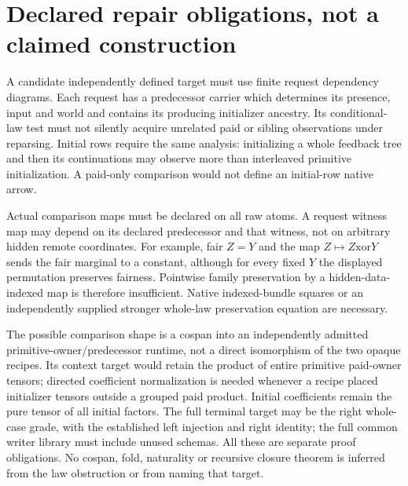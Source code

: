 \documentclass[11pt]{article}\usepackage{amsmath,amssymb,geometry}\geometry{margin=1in}
\begin{document}
\section*{Declared repair obligations, not a claimed construction}
A candidate independently defined target must use finite request dependency diagrams. Each request has a predecessor carrier which determines its presence, input and world and contains its producing initializer ancestry. Its conditional-law test must not silently acquire unrelated paid or sibling observations under reparsing. Initial rows require the same analysis: initializing a whole feedback tree and then its continuations may observe more than interleaved primitive initialization. A paid-only comparison would not define an initial-row native arrow.

Actual comparison maps must be declared on all raw atoms. A request witness map may depend on its declared predecessor and that witness, not on arbitrary hidden remote coordinates. For example, fair $Z=Y$ and the map $Z\mapsto Z\mathbin{\mathrm{xor}}Y$ sends the fair marginal to a constant, although for every fixed $Y$ the displayed permutation preserves fairness. Pointwise family preservation by a hidden-data-indexed map is therefore insufficient. Native indexed-bundle squares or an independently supplied stronger whole-law preservation equation are necessary.

The possible comparison shape is a cospan into an independently admitted primitive-owner/predecessor runtime, not a direct isomorphism of the two opaque recipes. Its context target would retain the product of entire primitive paid-owner tensors; directed coefficient normalization is needed whenever a recipe placed initializer tensors outside a grouped paid product. Initial coefficients remain the pure tensor of all initial factors. The full terminal target may be the right whole-case grade, with the established left injection and right identity; the full common writer library must include unused schemas. All these are separate proof obligations. No cospan, fold, naturality or recursive closure theorem is inferred from the law obstruction or from naming that target.
\end{document}
